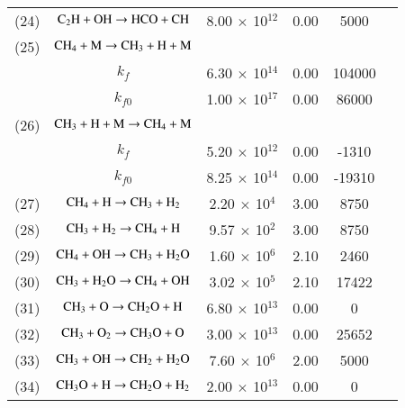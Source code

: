 \documentclass{warpdoc}
\begin{document}
\begin{table}[h]
\begin{center}
\begin{threeparttable}
\begin{tabular}{cccccc}
(24) & $\rm C_2 H + OH \rightarrow HCO + CH $ &8.00 $\times$ 10$^{12}$  & 0.00 &5000 &\cite{ef:2017:zettervall}\\

(25) & $\rm C H_4 +M \rightarrow CH_3 + H +M $  &  &  &  & \cite{rkm:1991:smoke}\\

  & $k_f $ \tnote{c} & 6.30 $\times$ 10$^{14}$ &0.00  &104000  &\\

  & $k_{f0} $\tnote{c} & 1.00 $\times$ 10$^{17}$ & 0.00 & 86000 &\\
  
  (26) & $\rm CH_3 + H +M  \rightarrow C H_4 + M $&  &  &  &\cite{rkm:1991:smoke}\\

  & $k_f $ & 5.20 $\times$ 10$^{12}$ &0.00  &-1310  &\\

  & $k_{f0} $ & 8.25 $\times$ 10$^{14}$ & 0.00 & -19310 &\\
  
(27) & $\rm C H_4 + H \rightarrow C H_3 + H_2 $ &2.20 $\times$ 10$^{4}$  & 3.00 &8750 &\cite{rkm:1991:smoke}\\  

(28) & $\rm C H_3 + H_2 \rightarrow C H_4 + H $ &9.57 $\times$ 10$^{2}$  & 3.00 &8750 &\cite{rkm:1991:smoke}\\ 

(29) & $\rm C H_4 + OH \rightarrow C H_3 + H_2 O $ &1.60 $\times$ 10$^{6}$  & 2.10 &2460 &\cite{rkm:1991:smoke}\\ 

(30) & $\rm C H_3 + H_2 O \rightarrow C H_4 + OH $ &3.02 $\times$ 10$^{5}$  & 2.10 &17422 &\cite{rkm:1991:smoke}\\ 

(31) & $\rm C H_3 + O \rightarrow C H_2 O + H $ &6.80 $\times$ 10$^{13}$  & 0.00 &0 &\cite{rkm:1991:smoke}\\ 

(32) & $\rm C H_3 + O_2 \rightarrow C H_3 O + O $ &3.00 $\times$ 10$^{13}$  & 0.00 &25652 &\cite{rkm:1991:smoke}\\ 

(33) & $\rm C H_3 + OH \rightarrow C H_2  + H_2 O $ &7.60 $\times$ 10$^{6}$  & 2.00 &5000 &\cite{comb:2010:glassman}\\

(34) & $\rm C H_3 O + H \rightarrow C H_2 O  + H_2 $ &2.00 $\times$ 10$^{13}$  & 0.00 &0 &\cite{rkm:1991:smoke}\\ 


\end{tabular}
\end{threeparttable}
\end{center}
\end{table}
\end{document}
